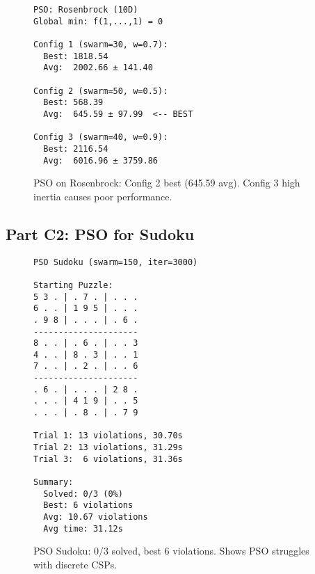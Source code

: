 \documentclass[letterpaper]{article}
\begin{document}
\begin{figure}[h]
\begin{scriptsize}
\begin{verbatim}
PSO: Rosenbrock (10D)
Global min: f(1,...,1) = 0

Config 1 (swarm=30, w=0.7):
  Best: 1818.54
  Avg:  2002.66 ± 141.40

Config 2 (swarm=50, w=0.5):
  Best: 568.39
  Avg:  645.59 ± 97.99  <-- BEST

Config 3 (swarm=40, w=0.9):
  Best: 2116.54
  Avg:  6016.96 ± 3759.86
\end{verbatim}
\end{scriptsize}
\caption{PSO on Rosenbrock: Config 2 best (645.59 avg). Config 3 high inertia causes poor performance.}
\label{fig:pso-rosenbrock}
\end{figure}

\subsection{Part C2: PSO for Sudoku}

\begin{figure}[h]
\begin{scriptsize}
\begin{verbatim}
PSO Sudoku (swarm=150, iter=3000)

Starting Puzzle:
5 3 . | . 7 . | . . .
6 . . | 1 9 5 | . . .
. 9 8 | . . . | . 6 .
---------------------
8 . . | . 6 . | . . 3
4 . . | 8 . 3 | . . 1
7 . . | . 2 . | . . 6
---------------------
. 6 . | . . . | 2 8 .
. . . | 4 1 9 | . . 5
. . . | . 8 . | . 7 9

Trial 1: 13 violations, 30.70s
Trial 2: 13 violations, 31.29s
Trial 3:  6 violations, 31.36s

Summary:
  Solved: 0/3 (0%)
  Best: 6 violations
  Avg: 10.67 violations
  Avg time: 31.12s
\end{verbatim}
\end{scriptsize}
\caption{PSO Sudoku: 0/3 solved, best 6 violations. Shows PSO struggles with discrete CSPs.}
\label{fig:pso-sudoku}
\end{figure}



\end{document}
